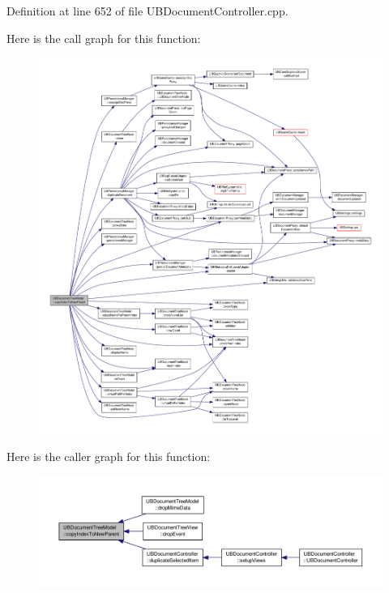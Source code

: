 Definition at line 652 of file U\-B\-Document\-Controller.\-cpp.



Here is the call graph for this function\-:
\nopagebreak
\begin{figure}[H]
\begin{center}
\leavevmode
\includegraphics[width=350pt]{dd/d5a/class_u_b_document_tree_model_ade622c3d2ab31bbff2304db2bbbcf72a_cgraph}
\end{center}
\end{figure}




Here is the caller graph for this function\-:
\nopagebreak
\begin{figure}[H]
\begin{center}
\leavevmode
\includegraphics[width=350pt]{dd/d5a/class_u_b_document_tree_model_ade622c3d2ab31bbff2304db2bbbcf72a_icgraph}
\end{center}
\end{figure}



